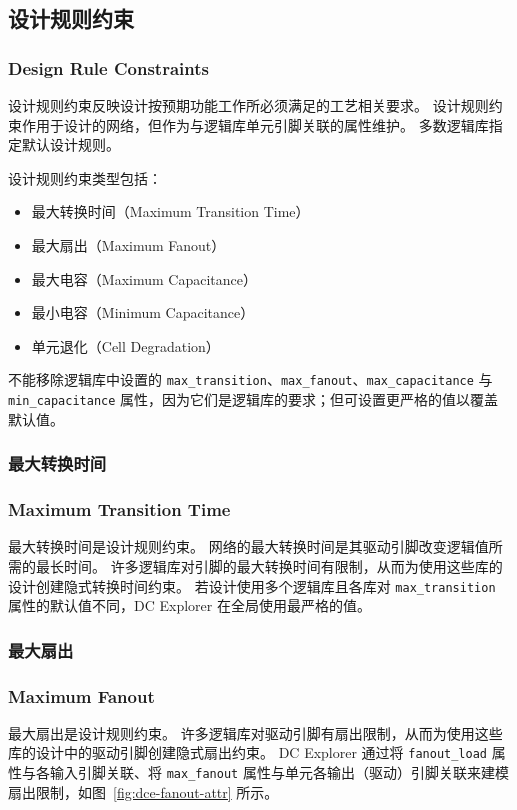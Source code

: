 \subsection{设计规则约束}
\subsubsection*{Design Rule Constraints}

设计规则约束反映设计按预期功能工作所必须满足的工艺相关要求。
设计规则约束作用于设计的网络，但作为与逻辑库单元引脚关联的属性维护。
多数逻辑库指定默认设计规则。

设计规则约束类型包括：
\begin{itemize}
  \item 最大转换时间（Maximum Transition Time）
  \item 最大扇出（Maximum Fanout）
  \item 最大电容（Maximum Capacitance）
  \item 最小电容（Minimum Capacitance）
  \item 单元退化（Cell Degradation）
\end{itemize}

不能移除逻辑库中设置的 \texttt{max\_transition}、\texttt{max\_fanout}、\texttt{max\_capacitance} 与 \texttt{min\_capacitance} 属性，因为它们是逻辑库的要求；但可设置更严格的值以覆盖默认值。

\subsubsection{最大转换时间}
\subsubsection*{Maximum Transition Time}

最大转换时间是设计规则约束。
网络的最大转换时间是其驱动引脚改变逻辑值所需的最长时间。
许多逻辑库对引脚的最大转换时间有限制，从而为使用这些库的设计创建隐式转换时间约束。
若设计使用多个逻辑库且各库对 \texttt{max\_transition} 属性的默认值不同，DC Explorer 在全局使用最严格的值。

\subsubsection{最大扇出}
\subsubsection*{Maximum Fanout}

最大扇出是设计规则约束。
许多逻辑库对驱动引脚有扇出限制，从而为使用这些库的设计中的驱动引脚创建隐式扇出约束。
DC Explorer 通过将 \texttt{fanout\_load} 属性与各输入引脚关联、将 \texttt{max\_fanout} 属性与单元各输出（驱动）引脚关联来建模扇出限制，如图~\ref{fig:dce-fanout-attr} 所示。


